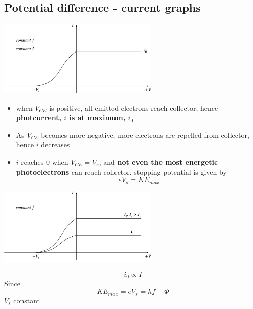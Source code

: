 \documentclass[a4paper, 10pt]{article}
\begin{document}
\subsection{Potential difference - current graphs}
\begin{minipage}{0.5\textwidth}
   \begin{center}
      \includegraphics[width=3in]{figures/4.pdf} 
   \end{center}	
\end{minipage}
\begin{minipage}{0.5\textwidth}
   \begin{itemize}
      \item when $V_{CE}$  is positive, all emitted electrons reach collector, hence \textbf{photcurrent, $i$ is at maximum, $i_0$ }
      \item As $V_{CE}$ becomes more negative, more electrons are repelled from collector, hence $i$ decreases
      \item $i$  reaches 0 when $V_{CE} = V_s$, and \textbf{not even the most energetic photoelectrons} can reach collector. stopping potential is given by
         \[
            eV_s = KE_{max}
         \]
   \end{itemize}	
\end{minipage}


\begin{minipage}{0.5\textwidth}
   \begin{center}
      \includegraphics[width=3in]{figures/5.pdf} 
   \end{center}	
\end{minipage}
\begin{minipage}{0.5\textwidth}
   \[
   i_0 \propto I
   \]
   Since 
   \[
      KE_{max} = eV_s = hf - \Phi
   \]
   $V_s$ constant
\end{minipage}
\end{document}
